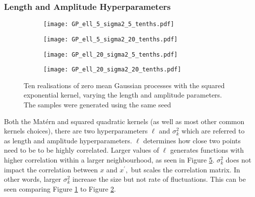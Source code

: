 \subsubsection*{Length and Amplitude Hyperparameters}

\begin{figure}[htbp]
    \centering
    \begin{subfigure}[b]{0.5\textwidth}
        \centering
        \texttt{[image: GP\_ell\_5\_sigma2\_5\_tenths.pdf]}
        \label{fig:half_half}
    \end{subfigure}%
    \hfill%
    \begin{subfigure}[b]{0.5\textwidth}
        \centering
        \texttt{[image: GP\_ell\_5\_sigma2\_20\_tenths.pdf]}
        \label{fig:half_two}
    \end{subfigure}
    \begin{subfigure}[b]{0.5\textwidth}
        \centering
        \texttt{[image: GP\_ell\_20\_sigma2\_5\_tenths.pdf]}
        \label{fig:two_half}
    \end{subfigure}%
    \hfill%
    \begin{subfigure}[b]{0.5\textwidth}
        \centering
        \texttt{[image: GP\_ell\_20\_sigma2\_20\_tenths.pdf]}
        \label{fig:two_two}
    \end{subfigure}%
    \caption{
        Ten realisations of zero mean Gaussian processes with the squared
        exponential kernel, varying the length and amplitude parameters.
        The samples were generated using the same seed
    }
    \label{fig:length_amp}
\end{figure}

Both the Mat\'ern and squared quadratic kernels
(as well as most other common kernels choices), there are two
hyperparameters $\ell$ and $\sigma^2_k$ which are referred to as length and
amplitude hyperparameters. $\ell$ determines how close two points need
to be to be highly correlated. Larger values of $\ell$ generates functions with
higher correlation within a larger neighbourhood,
as seen in Figure \ref{fig:length_amp}. $\sigma^2_k$ does not impact
the correlation between $x$ and $x^\prime,$ but scales the correlation
matrix. In other words, larger $\sigma^2_k$ increase the size but not rate of
fluctuations. This can be seen comparing Figure \ref{fig:half_half} to Figure
\ref{fig:half_two}.

